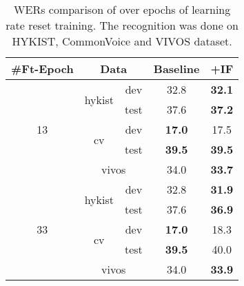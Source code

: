 

\begin{table}[!ht]
\centering
\begin{adjustbox}{width=0.5\columnwidth,center}
\begin{tabular}{|c|c|c|cc|} 
\hline
\#Ft-Epoch          & \multicolumn{2}{c|}{Data}      & Baseline      & +IF                \\ 
\hline
\multirow{5}{*}{13} & \multirow{2}{*}{hykist} & dev  & 32.8          & \textbf{32.1}           \\ 
\cline{3-5}
                    &                         & test & 37.6          & \textbf{37.2}           \\ 
\cline{2-5}
                    & \multirow{2}{*}{cv}     & dev  & \textbf{17.0} & 17.5                    \\ 
\cline{3-5}
                    &                         & test & \textbf{39.5} & \textbf{39.5}           \\ 
\cline{2-5}
                    & \multicolumn{2}{c|}{vivos}     & 34.0          & \textbf{33.7}           \\ 
\hline
\multirow{5}{*}{33} & \multirow{2}{*}{hykist} & dev  & 32.8          & \textbf{\textbf{31.9}}  \\ 
\cline{3-5}
                    &                         & test & 37.6          & \textbf{\textbf{36.9}}  \\ 
\cline{2-5}
                    & \multirow{2}{*}{cv}     & dev  & \textbf{17.0} & 18.3                    \\ 
\cline{3-5}
                    &                         & test & \textbf{39.5} & 40.0                    \\ 
\cline{2-5}
                    & \multicolumn{2}{c|}{vivos}     & 34.0          & \textbf{33.9}           \\
\hline
\end{tabular}
\end{adjustbox}
\caption{\glspl{WER} comparison of  over epochs of learning rate reset training. The recognition was done on HYKIST, CommonVoice and VIVOS dataset.}
\label{Lr_reset_int_loss}
\end{table}